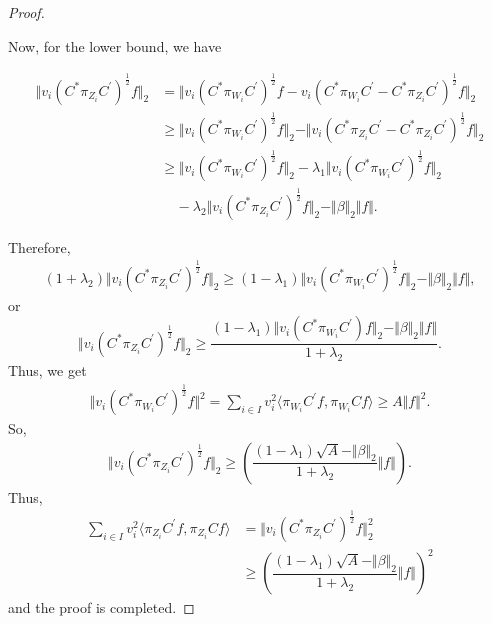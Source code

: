\documentclass{mfatshort}
\begin{document}
\begin{proof}
\begin{small}
\end{small}
Now, for the lower bound, we have
\begin{small}
\begin{align*}
\Vert v_{i} (C^{*} \pi_{Z_{i}}C^{\prime})^{\frac{1}{2}}f \Vert_{2}&=\Vert v_{i}(C^{*}\pi_{W_{i}} C^{\prime})^{\frac{1}{2}}f -v_{i}(C^{*}\pi_{W_{i}} C^{\prime}
- C ^{*}\pi_{{Z}_{i}}C^{\prime})^{\frac{1}{2}}f\Vert_{2}\\
&\geq \Vert v_{i}(C^{*}\pi_{W_{i}}C^{\prime})^{\frac{1}{2}}f \Vert_{2}-\Vert v_{i}(C ^{*}\pi_{Z_{i}} C^{\prime}- C^{*} \pi_{{Z}_{i}}C^{\prime})^{\frac{1}{2}}f\Vert_{2}\\ &\geq \Vert v_{i}(C ^{*}\pi_{W_{i}} C^{\prime})^{\frac{1}{2}}f \Vert_{2}-\lambda _{1}\Vert v_{i}(C^{*}\pi_{W_{i}} C^{\prime})^{\frac{1}{2}}f \Vert_{2}\\
&\ \ \ \ \ -\lambda _{2}\Vert v_{i}( C^{*} \pi_{{Z}_{i}}C^{\prime})^{\frac{1}{2}}f \Vert_{2} -\Vert\beta\Vert_{2}\Vert f \Vert.
\end{align*}
\end{small}
Therefore,
\begin{align*}
(1+\lambda_{2})\Vert v_{i} (C^{*} \pi_{{Z}_{i}}C^{\prime})^{\frac{1}{2}}f \Vert_{2}\geq(1-\lambda_{1})\Vert v_{i}(C^{*}\pi_{W_{i}} C^{\prime})^{\frac{1}{2}}f \Vert_{2}-\Vert\beta\Vert_{2}\Vert f \Vert,
\end{align*}
or
$$\Vert v_{i} (C^{*} \pi_{{Z}_{i}}C^{\prime})^{\frac{1}{2}}f \Vert_{2}\geq\dfrac{(1-\lambda_{1})\Vert v_{i}(C^{*}\pi_{W_{i}} C^{\prime})f \Vert_{2}-\Vert\beta\Vert_{2}\Vert f \Vert}{1+\lambda _{2}}. $$
Thus, we get
\begin{align*}
\Vert v_{i}(C^{*}\pi_{W_{i}}C^{\prime})^{\frac{1}{2}}f \Vert^{2}=\sum _{i \in I} v_{i}^{2}\langle \pi_{W_{i}}  C^{\prime}f, \pi _{W_{i}} C f \rangle\geq  A\Vert f \Vert^{2}.
\end{align*}
So,
\begin{align*}
\Vert v_{i} (C^{*} \pi_{{Z}_{i}}C^{\prime})^{\frac{1}{2}}f \Vert_{2}\geq(\dfrac{(1-\lambda_{1})\sqrt{A}-\Vert\beta\Vert_{2}}{1+\lambda _{2}}\Vert f \Vert).
\end{align*}
Thus,
\begin{align*}
\sum _{i \in I} v_{i}^{2}\langle \pi_{Z_{i}}  C^{\prime}f, \pi _{Z_{i}} C f\rangle
&=\Vert v_{i} (C^{*} \pi_{{Z}_{i}}C^{\prime})^{\frac{1}{2}}f \Vert^{2}_{2}\\
&\geq(\dfrac{(1-\lambda_{1})\sqrt{A}-\Vert\beta\Vert_{2}}{1+\lambda _{2}}\Vert f \Vert)^{2}
\end{align*}
and the proof is completed.
\end{proof}
\end{document}
